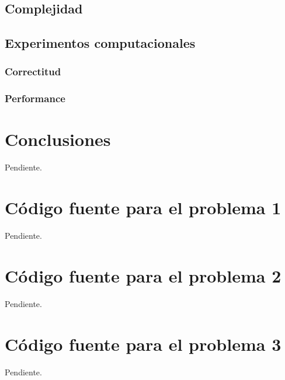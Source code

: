 \documentclass[a4paper,10pt,twoside]{article}
\begin{document}
\subsection{Complejidad}
\subsection{Experimentos computacionales}
\subsubsection{Correctitud}
\subsubsection{Performance}



\section{Conclusiones}

Pendiente.



\newpage

\begin{appendices}

\section{Código fuente para el problema 1}

Pendiente.




\section{Código fuente para el problema 2}

Pendiente.




\section{Código fuente para el problema 3}

Pendiente.


\end{appendices}
\end{document}
